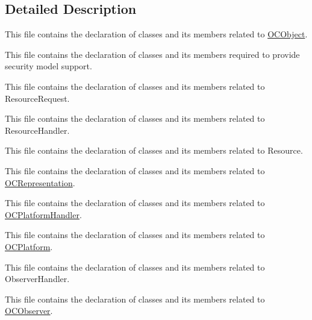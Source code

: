 \subsection{Detailed Description}
This file contains the declaration of classes and its members related to \hyperlink{classOC_1_1OCObject}{O\+C\+Object}. 

This file contains the declaration of classes and its members required to provide security model support.

This file contains the declaration of classes and its members related to Resource\+Request.

This file contains the declaration of classes and its members related to Resource\+Handler.

This file contains the declaration of classes and its members related to Resource.

This file contains the declaration of classes and its members related to \hyperlink{classOC_1_1OCRepresentation}{O\+C\+Representation}.

This file contains the declaration of classes and its members related to \hyperlink{classOC_1_1OCPlatformHandler}{O\+C\+Platform\+Handler}.

This file contains the declaration of classes and its members related to \hyperlink{classOC_1_1OCPlatform}{O\+C\+Platform}.

This file contains the declaration of classes and its members related to Observer\+Handler.

This file contains the declaration of classes and its members related to \hyperlink{classOC_1_1OCObserver}{O\+C\+Observer}. 